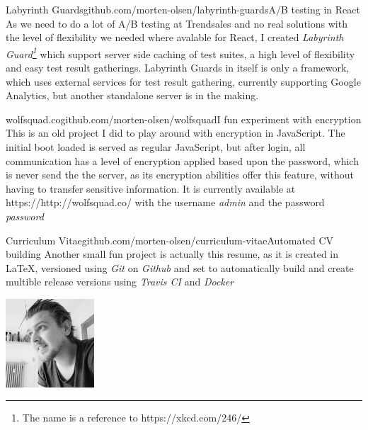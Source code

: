 \begin{cvproj}{Labyrinth Guards}{github.com/morten-olsen/labyrinth-guards}{A/B testing in React}
	As we need to do a lot of A/B testing at Trendsales and no real solutions with the level of flexibility we needed where avalable for React, I created \textit{Labyrinth Guard\footnote{The name is a reference to https://xkcd.com/246/}} which support server side caching of test suites, a high level of flexibility and easy test result gatherings. Labyrinth Guards in itself is only a framework, which uses external services for test result gathering, currently supporting Google Analytics, but another standalone server is in the making.
\end{cvproj}

\begin{cvproj}{wolfsquad.co}{github.com/morten-olsen/wolfsquad}{I fun experiment with encryption}
	This is an old project I did to play around with encryption in JavaScript. The initial boot loaded is served as regular JavaScript, but after login, all communication has a level of encryption applied based upon the password, which is never send the the server, as its encryption abilities offer this feature, without having to transfer sensitive information. It is currently available at https://http://wolfsquad.co/ with the username \textit{admin} and the password \textit{password}
\end{cvproj}

\begin{cvproj}{Curriculum Vitae}{github.com/morten-olsen/curriculum-vitae}{Automated CV building}
Another small fun project is actually this resume, as it is created in \LaTeX, versioned using \textit{Git} on \textit{Github} and set to automatically build and create multible release versions using \textit{Travis CI} and \textit{Docker}
\end{cvproj}
\begin{card}
	\begin{minipage}{1.6in}
		\cardline{}
	\end{minipage}
	\hfill
	\begin{minipage}{1.3in}
		\includegraphics[height=1.3in]{me.jpg}
	\end{minipage}
\end{card}
